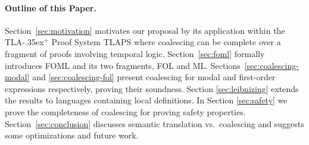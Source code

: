 \documentclass{easychair}
\newif\ifdraft
\newcommand{\commentOut}[1]{\ifdraft{%
 \edmargin{\color{green}\mbox{}\\[2em]Note}{Green text is commented out and
     appears only in draft mode.}%
\color{green}#1}\else\fi}
\newcommand{\tlaplus}{\mbox{TLA\kern -.35ex$^+$}\xspace}
\newcommand{\edmargin}[2]{\marginpar{\raggedright\footnotesize\color{red}#1: #2}}
\newcommand{\edmargin}[2]{}
\def\llmargin{\edmargin{LL}}
\def\jkmargin{\edmargin{JK}}
\begin{document}




\paragraph{Outline of this Paper.}

%
%
Section~\ref{sec:motivation} motivates our proposal by its application within
the \tlaplus Proof System TLAPS where coalescing can be complete over a fragment
of proofs involving temporal logic.
Section~\ref{sec:foml} formally introduces FOML and its two fragments,
FOL and ML\@.  Sections~\ref{sec:coalescing-modal} and
\ref{sec:coalescing-fol} present coalescing for modal and first-order
expressions respectively, proving their soundness.  Section
\ref{sec:leibnizing} extends the results to languages containing local
definitions.  In Section \ref{sec:safety} we prove the completeness of coalescing for proving safety properties. Section~\ref{sec:conclusion} discusses semantic translation vs.\
coalescing and suggests some optimizations and future work.
\end{document}
